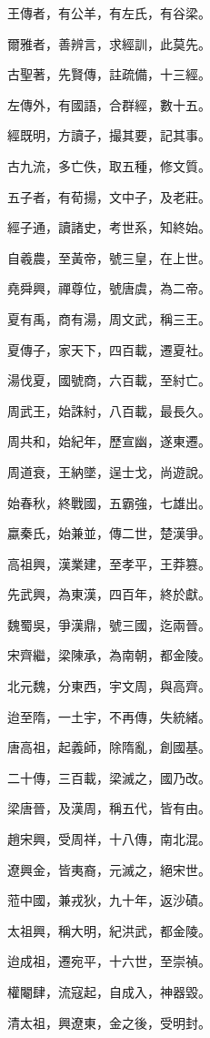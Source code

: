 \documentclass[12pt,a4paper]{ctexbook}
\begin{document}
王傳者，有公羊，有左氏，有谷梁。\par
爾雅者，善辨言，求經訓，此莫先。\par
古聖著，先賢傳，註疏備，十三經。\par
左傳外，有國語，合群經，數十五。\par
經既明，方讀子，撮其要，記其事。\par
古九流，多亡佚，取五種，修文質。\par
五子者，有荀揚，文中子，及老莊。\par
經子通，讀諸史，考世系，知終始。\par
自羲農，至黃帝，號三皇，在上世。\par
堯舜興，禪尊位，號唐虞，為二帝。\par
夏有禹，商有湯，周文武，稱三王。\par
夏傳子，家天下，四百載，遷夏社。\par
湯伐夏，國號商，六百載，至紂亡。\par
周武王，始誅紂，八百載，最長久。\par
周共和，始紀年，歷宣幽，遂東遷。\par
周道衰，王納墜，逞士戈，尚遊說。\par
始春秋，終戰國，五霸強，七雄出。\par
蠃秦氏，始兼並，傳二世，楚漢爭。\par
高祖興，漢業建，至孝平，王莽篡。\par
先武興，為東漢，四百年，終於獻。\par
魏蜀吳，爭漢鼎，號三國，迄兩晉。\par
宋齊繼，梁陳承，為南朝，都金陵。\par
北元魏，分東西，宇文周，與高齊。\par
迨至隋，一土宇，不再傳，失統緒。\par
唐高祖，起義師，除隋亂，創國基。\par
二十傳，三百載，梁滅之，國乃改。\par
梁唐晉，及漢周，稱五代，皆有由。\par
趙宋興，受周祥，十八傳，南北混。\par
遼興金，皆夷裔，元滅之，絕宋世。\par
蒞中國，兼戎狄，九十年，返沙磧。\par
太祖興，稱大明，紀洪武，都金陵。\par
迨成祖，遷宛平，十六世，至崇禎。\par
權閹肆，流寇起，自成入，神器毀。\par
清太祖，興遼東，金之後，受明封。\par
\end{document}

